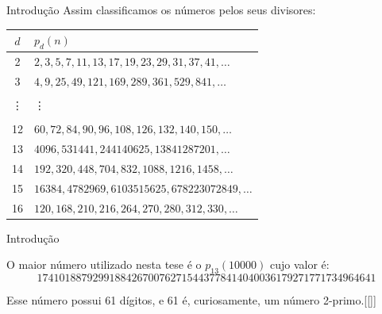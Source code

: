 \documentclass[12pt,
aspectratio=169,
]{beamer}
\begin{document}
\begin{frame}{Introdução}
Assim classificamos os n\'umeros pelos seus divisores:

\begin{tabular}{|c|l|} \hline
        $d$ & $p_d(n)$ \\
        \hline
        2 & $2, 3, 5, 7, 11, 13, 17, 19, 23, 29, 31, 37, 41, \ldots$ \\
        3 & $4, 9, 25, 49, 121, 169, 289, 361, 529, 841, \ldots$ \\
        & \\
        \vdots & \vdots \\
        & \\
        12 & $ 60, 72, 84, 90, 96, 108, 126, 132, 140, 150, \ldots$ \\
        13 & $ 4096, 531441, 244140625, 13841287201, \ldots$ \\
        14 & $ 192, 320, 448, 704, 832, 1088, 1216, 1458, \ldots$ \\
        15 & $ 16384, 4782969, 6103515625, 678223072849, \ldots$ \\
        16 & $120, 168, 210, 216, 264, 270, 280, 312, 330, \ldots$ \\
        \hline
    \end{tabular}
    \label{tab:n-primes}
\end{frame}


\begin{frame}{Introdução}

O maior número utilizado nesta tese é o $p_{13}(10000)$ cujo valor é:
$$1741018879299188426700762715443778414040036179271771734964641$$

Esse número possui 61 dígitos, e 61 é, curiosamente, um número 2-primo.[[]]
\end{frame}
\end{document}
